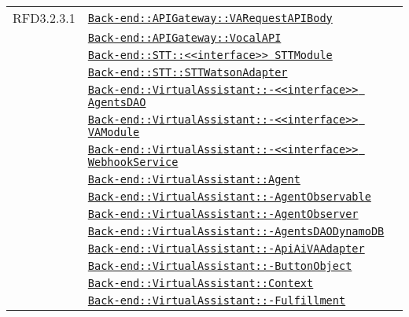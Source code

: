 \begin{longtable}{|>{\centering}m{3cm}|m{10cm}<{\centering}|}
RFD3.2.3.1 & \hyperref[Back-end::APIGateway::VARequestAPIBody]{\texttt{Back-end::APIGateway::VARequestAPIBody}}\\
& \hyperref[Back-end::APIGateway::VocalAPI]{\texttt{Back-end::APIGateway::VocalAPI}}\\
& \hyperref[Back-end::STT::<<interface>> STTModule]{\texttt{Back-end::STT::<<interface>> STTModule}}\\
& \hyperref[Back-end::STT::STTWatsonAdapter]{\texttt{Back-end::STT::STTWatsonAdapter}}\\
& \hyperref[Back-end::VirtualAssistant::<<interface>> AgentsDAO]{\texttt{Back-end::VirtualAssistant::-\linebreak <<interface>> AgentsDAO}}\\
& \hyperref[Back-end::VirtualAssistant::<<interface>> VAModule]{\texttt{Back-end::VirtualAssistant::-\linebreak <<interface>> VAModule}}\\
& \hyperref[Back-end::VirtualAssistant::<<interface>> WebhookService]{\texttt{Back-end::VirtualAssistant::-\linebreak <<interface>> WebhookService}}\\
& \hyperref[Back-end::VirtualAssistant::Agent]{\texttt{Back-end::VirtualAssistant::Agent}}\\
& \hyperref[Back-end::VirtualAssistant::AgentObservable]{\texttt{Back-end::VirtualAssistant::-\linebreak AgentObservable}}\\
& \hyperref[Back-end::VirtualAssistant::AgentObserver]{\texttt{Back-end::VirtualAssistant::-\linebreak AgentObserver}}\\
& \hyperref[Back-end::VirtualAssistant::AgentsDAODynamoDB]{\texttt{Back-end::VirtualAssistant::-\linebreak AgentsDAODynamoDB}}\\
& \hyperref[Back-end::VirtualAssistant::ApiAiVAAdapter]{\texttt{Back-end::VirtualAssistant::-\linebreak ApiAiVAAdapter}}\\
& \hyperref[Back-end::VirtualAssistant::ButtonObject]{\texttt{Back-end::VirtualAssistant::-\linebreak ButtonObject}}\\
& \hyperref[Back-end::VirtualAssistant::Context]{\texttt{Back-end::VirtualAssistant::Context}}\\
& \hyperref[Back-end::VirtualAssistant::Fulfillment]{\texttt{Back-end::VirtualAssistant::-\linebreak Fulfillment}}\\

\end{longtable}
